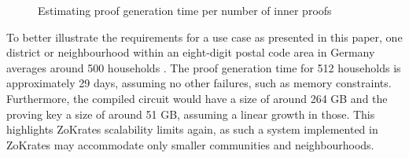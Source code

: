 \begin{figure}[h]
\centering
{}

\caption{Estimating proof generation time per number of inner proofs}
\label{figure:estim}
\end{figure}


To better illustrate the requirements for a use case as presented in this paper, one district or neighbourhood within an eight-digit postal code area in Germany averages around 500 households \cite{ptvplz82210db}. The proof generation time for 512 households is approximately 29 days, assuming no other failures, such as memory constraints. Furthermore, the compiled circuit would have a size of around 264 GB and the proving key a size of around 51 GB, assuming a linear growth in those. This highlights ZoKrates scalability limits again, as such a system implemented in ZoKrates may accommodate only smaller communities and neighbourhoods.